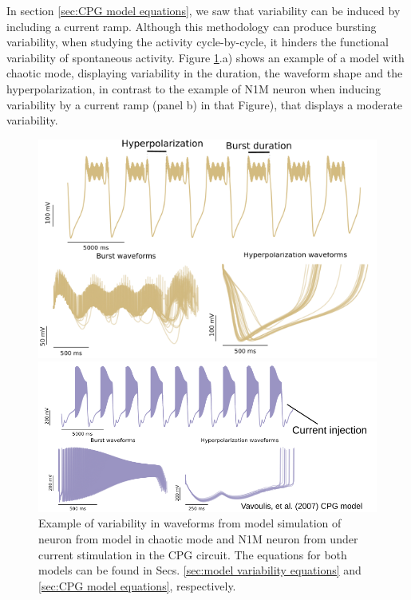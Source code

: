 In section \ref{sec:CPG model equations}, we saw that variability can be induced by including a current ramp.  Although this methodology can produce bursting  variability, when studying the activity cycle-by-cycle, it hinders the functional variability of spontaneous activity. Figure \ref{fig:model burst variability}.a) shows an example of a model with chaotic mode, displaying variability in the duration, the waveform shape and the hyperpolarization, in contrast to the example of N1M neuron when inducing variability by a current ramp (panel b) in that Figure), that displays a moderate variability. 


\begin{figure}[hbt]
	\centering
	\begin{minipage}{0.48\textwidth}
		\includegraphics[width=\textwidth]{img/invariants/variability/TN-burst_variability.png}
	\end{minipage}
	\begin{minipage}{0.48\textwidth}
		\includegraphics[width=\textwidth]{img/invariants/variability/n1m_vav_burst_variability.png}
	\end{minipage}
	\caption{Example of variability in waveforms from model simulation of neuron from \textcite{nowotny_probing_2008} model in chaotic mode and N1M neuron from \textcite{vavoulis_dynamic_2007} under current stimulation in the CPG circuit. The equations for both models can be found in Secs. \ref{sec:model variability equations} and \ref{sec:CPG model equations}, respectively.}
	\label{fig:model burst variability}
\end{figure}


